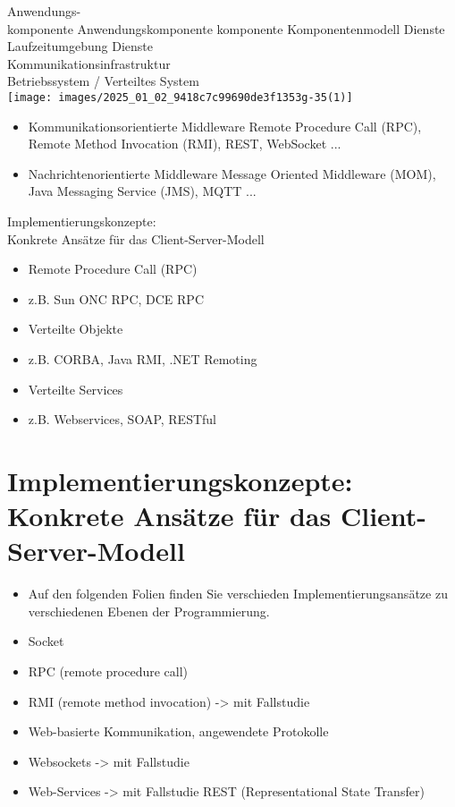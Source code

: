 \documentclass[10pt]{article}
\begin{document}
Anwendungs-\\
komponente Anwendungskomponente komponente Komponentenmodell Dienste Laufzeitumgebung Dienste\\
Kommunikationsinfrastruktur\\
Betriebssystem / Verteiltes System\\
\texttt{[image: images/2025\_01\_02\_9418c7c99690de3f1353g-35(1)]}

\begin{itemize}
  \item Kommunikationsorientierte Middleware Remote Procedure Call (RPC), Remote Method Invocation (RMI), REST, WebSocket ...
  \item Nachrichtenorientierte Middleware Message Oriented Middleware (MOM), Java Messaging Service (JMS), MQTT ...
\end{itemize}

Implementierungskonzepte:\\
Konkrete Ansätze für das Client-Server-Modell

\begin{itemize}
  \item Remote Procedure Call (RPC)
  \item z.B. Sun ONC RPC, DCE RPC
  \item Verteilte Objekte
  \item z.B. CORBA, Java RMI, .NET Remoting
  \item Verteilte Services
  \item z.B. Webservices, SOAP, RESTful
\end{itemize}

\section*{Implementierungskonzepte: \\
 Konkrete Ansätze für das Client-Server-Modell}
\begin{itemize}
  \item Auf den folgenden Folien finden Sie verschieden Implementierungsansätze zu verschiedenen Ebenen der Programmierung.
  \item Socket
  \item RPC (remote procedure call)
  \item RMI (remote method invocation) -> mit Fallstudie
  \item Web-basierte Kommunikation, angewendete Protokolle
  \item Websockets -> mit Fallstudie
  \item Web-Services -> mit Fallstudie REST (Representational State Transfer)
\end{itemize}
\end{document}

